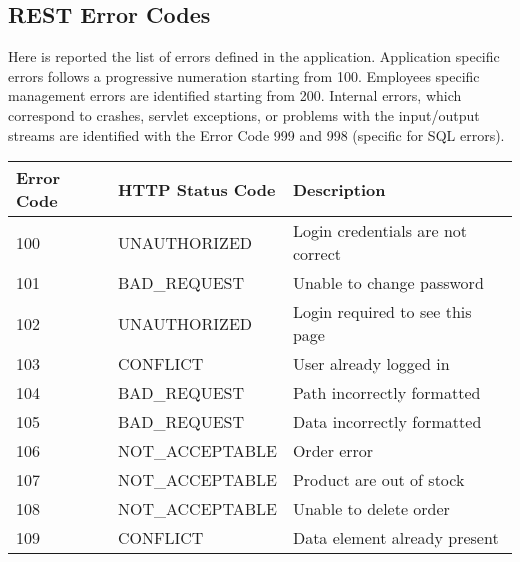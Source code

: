 \subsection{REST Error Codes}

Here is reported the list of errors defined in the application. Application specific errors follows a progressive numeration starting from 100. Employees specific management errors are identified starting from 200. Internal errors, which correspond to crashes, servlet exceptions, or problems with the input/output streams are identified with the Error Code 999 and 998 (specific for SQL errors).

\begin{longtable}{|p{}|p{}|p{}|}
\hline
\textbf{Error Code} & \textbf{HTTP Status Code} & \textbf{Description} \\\hline

100 & UNAUTHORIZED & Login credentials are not correct \\\hline
101 & BAD\_REQUEST & Unable to change password \\\hline
102 & UNAUTHORIZED & Login required to see this page \\\hline
103 & CONFLICT & User already logged in \\\hline
104 & BAD\_REQUEST & Path incorrectly formatted \\\hline
105 & BAD\_REQUEST & Data incorrectly formatted \\\hline
106 & NOT\_ACCEPTABLE & Order error \\\hline
107 & NOT\_ACCEPTABLE & Product are out of stock \\\hline
108 & NOT\_ACCEPTABLE & Unable to delete order \\\hline
109 & CONFLICT & Data element already present \\\hline


\end{longtable}
